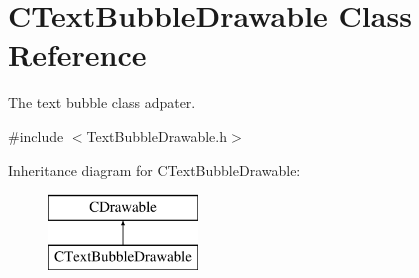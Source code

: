 \hypertarget{class_c_text_bubble_drawable}{\section{C\+Text\+Bubble\+Drawable Class Reference}
\label{class_c_text_bubble_drawable}
}


The text bubble class adpater.  




{\ttfamily \#include $<$Text\+Bubble\+Drawable.\+h$>$}

Inheritance diagram for C\+Text\+Bubble\+Drawable\+:\begin{figure}[H]
\begin{center}
\leavevmode
\includegraphics[height=2.000000cm]{class_c_text_bubble_drawable}
\end{center}
\end{figure}

